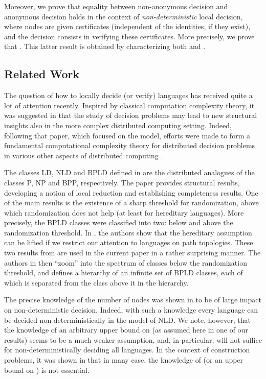 \documentclass{llncs}
\begin{document}
Moreover, we prove that equality between non-anonymous decision and anonymous decision holds in the context of \emph{non-deterministic} local decision, where nodes are given certificates (independent of the identities, if they exist), and the decision consists in verifying these certificates. More precisely, we prove that . This latter result is obtained by characterizing both  and . 

\subsection{Related Work}
The question of how to locally decide (or verify)  languages has 
received quite a lot of attention recently. 
Inspired by classical computation complexity theory,
it was suggested in \cite{FKP11} that the study of decision problems may lead to new
structural insights also in the more complex distributed computing setting.
Indeed, following that paper, which focused on the  model, efforts were made to form a fundamental
computational complexity theory for distributed decision problems in
various other aspects of distributed computing
\cite{FKP11,FP12,FRT11,FRT12}.

The classes LD, NLD and BPLD defined in \cite{FKP11} are
the distributed analogues of the classes  P, NP and BPP, respectively.
The paper provides structural results,
developing a notion of local reduction and establishing completeness results.
One of the main results is the existence of a sharp threshold for randomization,
above which randomization does not help (at least for hereditary languages). 
More precisely, the BPLD classes were classified into two:
below and above the randomization threshold. 
In \cite{FKPP12}, the authors show that the hereditary assumption can be lifted if we restrict our attention
to languages on path topologies. 
These two results from \cite{FKP11,FKPP12}  are used in the current paper in a rather surprising manner. 
The authors in \cite{FKPP12} then 
``zoom''
into the spectrum of classes below the randomization threshold, and
defines a hierarchy of an infinite set of BPLD classes, each of which
is separated from the class above it in the hierarchy.


The precise knowledge of the number of nodes  was shown in  \cite{FKP11} to be of large impact on non-deterministic decision. Indeed, with such a knowledge
every language can be decided non-deterministically in the model of NLD. We note, however, that the knowledge of an arbitrary upper bound on  (as assumed here in one of our results) seems to be a much weaker assumption, and, in particular, will not suffice for non-deterministically deciding all languages. In the context of construction problems, it was shown in \cite{KSV11} that in many case, the knowledge of  (or an upper bound on ) is not essential.
\end{document}
